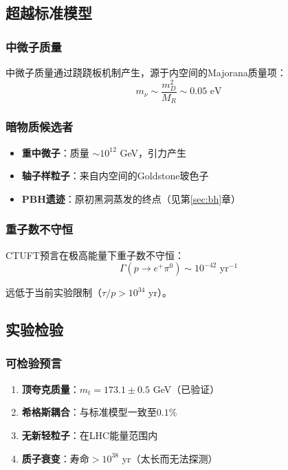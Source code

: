\subsection{超越标准模型}

\subsubsection{中微子质量}

中微子质量通过跷跷板机制产生，源于内空间的Majorana质量项：
\begin{equation}
    m_\nu \sim \frac{m_D^2}{M_R} \sim 0.05 \text{ eV}
\end{equation}

\subsubsection{暗物质候选者}

\begin{itemize}
    \item \textbf{重中微子}：质量 $\sim 10^{12}$ GeV，引力产生
    \item \textbf{轴子样粒子}：来自内空间的Goldstone玻色子
    \item \textbf{PBH遗迹}：原初黑洞蒸发的终点（见第\ref{sec:bh}章）
\end{itemize}

\subsubsection{重子数不守恒}

CTUFT预言在极高能量下重子数不守恒：
\begin{equation}
    \Gamma(p \to e^+ \pi^0) \sim 10^{-42} \text{ yr}^{-1}
\end{equation}

远低于当前实验限制（$\tau/p > 10^{34}$ yr）。

\subsection{实验检验}

\subsubsection{可检验预言}

\begin{enumerate}
    \item \textbf{顶夸克质量}：$m_t = 173.1 \pm 0.5$ GeV（已验证）
    \item \textbf{希格斯耦合}：与标准模型一致至$0.1\%$
    \item \textbf{无新轻粒子}：在LHC能量范围内
    \item \textbf{质子衰变}：寿命$> 10^{38}$ yr（太长而无法探测）
\end{enumerate}

